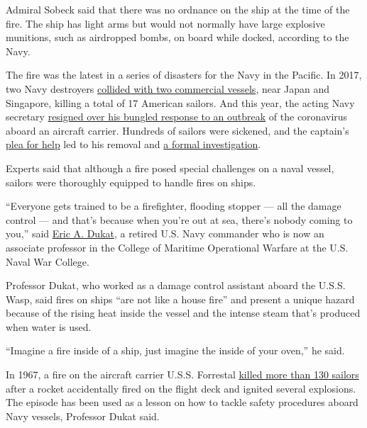 Admiral Sobeck said that there was no ordnance on the ship at the time
of the fire. The ship has light arms but would not normally have large
explosive munitions, such as airdropped bombs, on board while docked,
according to the Navy.

The fire was the latest in a series of disasters for the Navy in the
Pacific. In 2017, two Navy destroyers
\href{https://www.nytimes3xbfgragh.onion/2017/11/01/us/politics/navy-collisions-avoidable.html}{collided
with two commercial vessels}, near Japan and Singapore, killing a total
of 17 American sailors. And this year, the acting Navy secretary
\href{https://www.nytimes3xbfgragh.onion/2020/04/07/us/politics/coronavirus-navy-captain-firing.html}{resigned
over his bungled response to an outbreak} of the coronavirus aboard an
aircraft carrier. Hundreds of sailors were sickened, and the captain's
\href{https://www.nytimes3xbfgragh.onion/2020/04/02/us/politics/coronavirus-aircraft-carrier-roosevelt.html}{plea
for help} led to his removal and
\href{https://www.nytimes3xbfgragh.onion/2020/04/29/us/politics/navy-coronavirus-ship.html}{a
formal investigation}.

Experts said that although a fire posed special challenges on a naval
vessel, sailors were thoroughly equipped to handle fires on ships.

``Everyone gets trained to be a firefighter, flooding stopper --- all
the damage control --- and that's because when you're out at sea,
there's nobody coming to you,'' said
\href{https://usnwc.edu/Faculty-and-Departments/Directory/Eric-A-Dukat}{Eric
A. Dukat}, a retired U.S. Navy commander who is now an associate
professor in the College of Maritime Operational Warfare at the U.S.
Naval War College.

Professor Dukat, who worked as a damage control assistant aboard the
U.S.S. Wasp, said fires on ships ``are not like a house fire'' and
present a unique hazard because of the rising heat inside the vessel and
the intense steam that's produced when water is used.

``Imagine a fire inside of a ship, just imagine the inside of your
oven,'' he said.

In 1967, a fire on the aircraft carrier U.S.S. Forrestal
\href{https://www.history.com/this-day-in-history/rocket-causes-deadly-fire-on-aircraft-carrier}{killed
more than 130 sailors} after a rocket accidentally fired on the flight
deck and ignited several explosions. The episode has been used as a
lesson on how to tackle safety procedures aboard Navy vessels, Professor
Dukat said.

